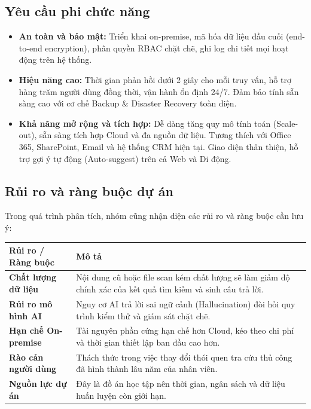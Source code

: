 \documentclass[12pt,a4paper]{report}
\begin{document}
\subsection{Yêu cầu phi chức năng}
\begin{itemize}
    \item \textbf{An toàn và bảo mật:} Triển khai on-premise, mã hóa dữ liệu đầu cuối (end-to-end encryption), phân quyền RBAC chặt chẽ, ghi log chi tiết mọi hoạt động trên hệ thống.
    \item \textbf{Hiệu năng cao:} Thời gian phản hồi dưới 2 giây cho mỗi truy vấn, hỗ trợ hàng trăm người dùng đồng thời, vận hành ổn định 24/7. Đảm bảo tính sẵn sàng cao với cơ chế Backup \& Disaster Recovery toàn diện.
    \item \textbf{Khả năng mở rộng và tích hợp:} Dễ dàng tăng quy mô tính toán (Scale-out), sẵn sàng tích hợp Cloud và đa nguồn dữ liệu. Tương thích với Office 365, SharePoint, Email và hệ thống CRM hiện tại. Giao diện thân thiện, hỗ trợ gợi ý tự động (Auto-suggest) trên cả Web và Di động.
\end{itemize}

\subsection{Rủi ro và ràng buộc dự án}
Trong quá trình phân tích, nhóm cũng nhận diện các rủi ro và ràng buộc cần lưu ý:

\begin{table}[H]
\centering
\begin{tabularx}{\textwidth}{|l|X|}
\hline
\rowcolor{gray!10}
Rủi ro / Ràng buộc & Mô tả \\ \hline
\textbf{Chất lượng dữ liệu} & Nội dung cũ hoặc file scan kém chất lượng sẽ làm giảm độ chính xác của kết quả tìm kiếm và sinh câu trả lời. \\ \hline
\textbf{Rủi ro mô hình AI} & Nguy cơ AI trả lời sai ngữ cảnh (Hallucination) đòi hỏi quy trình kiểm thử và giám sát chặt chẽ. \\ \hline
\textbf{Hạn chế On-premise} & Tài nguyên phần cứng hạn chế hơn Cloud, kéo theo chi phí và thời gian thiết lập ban đầu cao hơn. \\ \hline
\textbf{Rào cản người dùng} & Thách thức trong việc thay đổi thói quen tra cứu thủ công đã hình thành lâu năm của nhân viên. \\ \hline
\textbf{Nguồn lực dự án} & Đây là đồ án học tập nên thời gian, ngân sách và dữ liệu huấn luyện còn giới hạn. \\ \hline
\end{tabularx}
\end{table}
\end{document}
